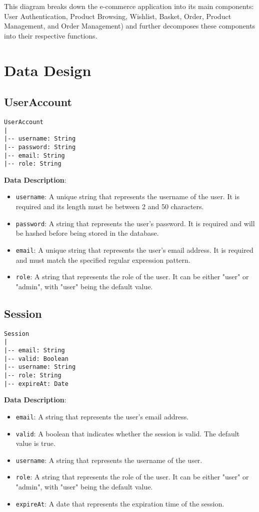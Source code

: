 This diagram breaks down the e-commerce application into its main components:
User Authentication, Product Browsing, Wishlist, Basket, Order, Product Management, and Order Management) and further decomposes these components into their respective functions.

\section{Data Design}

\subsection{UserAccount}

\begin{verbatim}
UserAccount
|
|-- username: String
|-- password: String
|-- email: String
|-- role: String
\end{verbatim}

\textbf{Data Description}:

\begin{itemize}
    \item \texttt{username}: A unique string that represents the username of the user. It is required and its length must be between 2 and 50 characters.
    \item \texttt{password}: A string that represents the user's password. It is required and will be hashed before being stored in the database.
    \item \texttt{email}: A unique string that represents the user's email address. It is required and must match the specified regular expression pattern.
    \item \texttt{role}: A string that represents the role of the user. It can be either "user" or "admin", with "user" being the default value.
\end{itemize}

\subsection{Session}

\begin{verbatim}
Session
|
|-- email: String
|-- valid: Boolean
|-- username: String
|-- role: String
|-- expireAt: Date
\end{verbatim}

\textbf{Data Description}:

\begin{itemize}
    \item \texttt{email}: A string that represents the user's email address.
    \item \texttt{valid}: A boolean that indicates whether the session is valid. The default value is true.
    \item \texttt{username}: A string that represents the username of the user.
    \item \texttt{role}: A string that represents the role of the user. It can be either "user" or "admin", with "user" being the default value.
    \item \texttt{expireAt}: A date that represents the expiration time of the session.
\end{itemize}

